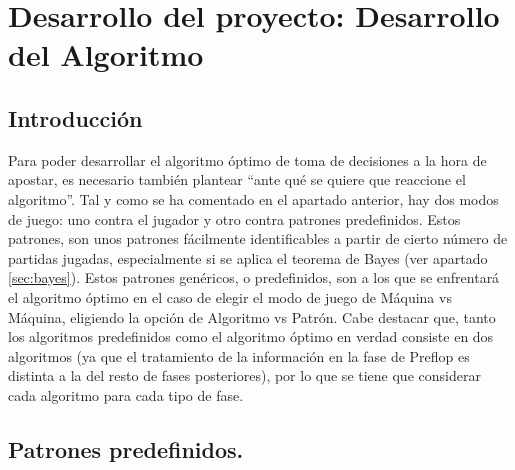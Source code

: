 \chapter{Desarrollo del proyecto: Desarrollo del Algoritmo}

\section {Introducción}

Para poder desarrollar el algoritmo óptimo de toma de decisiones a la hora de apostar, es necesario también plantear “ante qué se quiere que reaccione el algoritmo”. Tal y como se ha comentado en el apartado anterior, hay dos modos de juego: uno contra el jugador y otro contra patrones predefinidos. Estos patrones,  son unos patrones fácilmente identificables a partir de cierto número de partidas jugadas, especialmente si se aplica el teorema de Bayes (ver apartado \ref{sec:bayes}).
Estos patrones genéricos, o predefinidos, son a los que se enfrentará el algoritmo óptimo en el caso de elegir el modo de juego de Máquina vs Máquina, eligiendo la opción de Algoritmo vs Patrón.
Cabe destacar que, tanto los algoritmos predefinidos como el algoritmo óptimo en verdad consiste en dos algoritmos (ya que el tratamiento de la información en la fase de Preflop es distinta a la del resto de fases posteriores), por lo que se tiene que considerar cada algoritmo para cada tipo de fase.

\section {Patrones predefinidos.}

